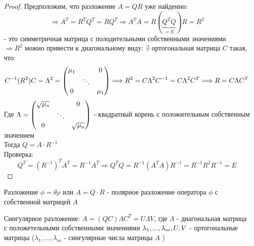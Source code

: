 \begin{proof}
    Предположим, что разложение $A = QR$ уже найденно:
    $$\Longrightarrow A^T = R^TQ^T =RQ^T \Longrightarrow A^TA = R(\underbrace{Q^TQ}_{=E})R = R^2$$ 
    - это симметричная матрица с полодительными собственными значениями\\
    $\Longrightarrow R^2$ можно привести к диагональному виду: $\exists$ ортогональная матрица $C$ такая, что:
    $$C^{-1}(R^2)C = \Lambda^2 = \begin{pmatrix}
        \mu_1 & \null & 0\\ \null & \ddots\\ 0 & \null & \mu_1
    \end{pmatrix} \Longrightarrow R^2 = C \Lambda^2C^{-1} = C \Lambda^2 C^T \Longrightarrow R = C \Lambda C^T$$
    Где $\Lambda = \begin{pmatrix}
        \sqrt{\mu_n} & \null & 0\\ \null & \ddots\\ 0 & \null & \sqrt{\mu_n}
    \end{pmatrix}$ - квадратный корень с положительным собственным значением \\
    Тогда $Q = A \cdot R^{-1}$ \\
    Проверка: 
    $$Q^T = (R^{-1})^TA^T = R^{-1}A^T \Longrightarrow Q^TQ = R^{-1}(A^TA)R^{-1} = R^{-1}R^2R^{-1} = E$$ 
\end{proof}
\begin{definition}
    Разложение $\phi = \theta \rho$  или $A = Q \cdot R$ - полярное разложение оператора $\phi$ с собственной матрицей $A$
\end{definition}
\begin{definition}
    Сингулярное разложение: $A = (QC) \Lambda C^T = U \Lambda V$, где $\Lambda$ - диагональная матрица с положетельными собственными значениями $\lambda_1,...,\lambda_m, \\ U,V$ - ортогональные матрицы ($\lambda_1,...,\lambda_m$ - сингулярные числа матрицы $A$ )
\end{definition} 